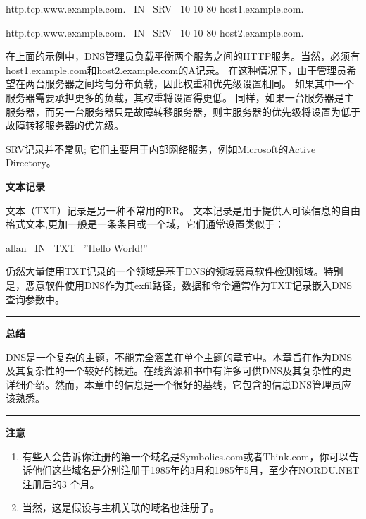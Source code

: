 ﻿\documentclass[english,runningheads,a4paper]{llncs}[2018/03/10]
\begin{document}
\par\setlength\parindent{2em}http.tcp.www.example.com. \ IN \ SRV \ 10 10 80 host1.example.com.

\par\setlength\parindent{2em}http.tcp.www.example.com. \ IN \ SRV \ 10 10 80 host2.example.com.


\par\setlength\parindent{2em}在上面的示例中，DNS管理员负载平衡两个服务之间的HTTP服务。当然，必须有host1.example.com和host2.example.com的A记录。 在这种情况下，由于管理员希望在两台服务器之间均匀分布负载，因此权重和优先级设置相同。 如果其中一个服务器需要承担更多的负载，其权重将设置得更低。 同样，如果一台服务器是主服务器，而另一台服务器只是故障转移服务器，则主服务器的优先级将设置为低于故障转移服务器的优先级。

\par\setlength\parindent{2em}SRV记录并不常见; 它们主要用于内部网络服务，例如Microsoft的Active Directory。

\vbox{}

\par\noindent\textbf{文本记录}

\par\noindent 文本（TXT）记录是另一种不常用的RR。 文本记录是用于提供人可读信息的自由格式文本,更加一般是一条条目或一个域，它们通常设置类似于：

\par\setlength\parindent{2em}allan \ IN \ TXT \ ”Hello World!”

\par\setlength\parindent{2em}仍然大量使用TXT记录的一个领域是基于DNS的领域恶意软件检测领域。特别是，恶意软件使用DNS作为其exfil路径，数据和命令通常作为TXT记录嵌入DNS查询参数中。

\vbox{}

\par\noindent\rule[0.25\baselineskip]{\textwidth}{1pt} %
\par\noindent\textbf{总结}
\par\setlength\parindent{2em}DNS是一个复杂的主题，不能完全涵盖在单个主题的章节中。本章旨在作为DNS及其复杂性的一个较好的概述。在线资源和书中有许多可供DNS及其复杂性的更详细介绍。然而，本章中的信息是一个很好的基线，它包含的信息DNS管理员应该熟悉。

\vbox{}

\par\noindent\rule[0.25\baselineskip]{\textwidth}{2pt} %
\par\noindent\textbf{注意}
\begin{enumerate}
\item 有些人会告诉你注册的第一个域名是Symbolics.com或者Think.com，你可以告诉他们这些域名是分别注册于1985年的3月和1985年5月，至少在NORDU.NET注册后的3 个月。
\item 当然，这是假设与主机关联的域名也注册了。    
\end{enumerate}
\end{document}
